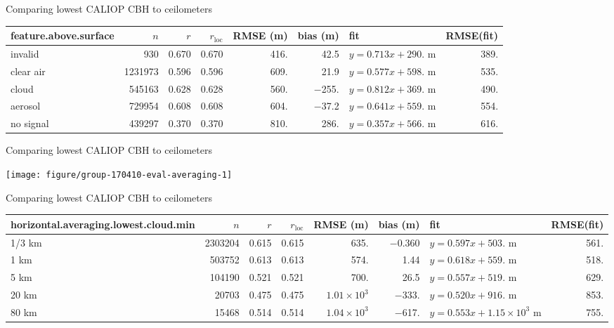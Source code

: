 \documentclass[10pt,notes=all,aspectratio=1610]{beamer}\usepackage[]{graphicx}\usepackage[]{color}
\newenvironment{knitrout}{}{} %
\begin{document}
\begin{frame}[fragile]{Comparing lowest CALIOP CBH to ceilometers}
  \begin{adjustbox}{max width=\textwidth}
\begin{tabular}{lrrrrrlr}
  \hline
\hline
feature.above.surface & $n$ & $r$ & $r_\text{loc}$ & RMSE (m) & bias (m) & fit & RMSE(fit) \\ 
  \hline
invalid &  930 & 0.670 & 0.670 & 416. & 42.5 & $y = 0.713 x + 290.$ m & 389. \\ 
  clear air & 1231973 & 0.596 & 0.596 & 609. & 21.9 & $y = 0.577 x + 598.$ m & 535. \\ 
  cloud & 545163 & 0.628 & 0.628 & 560. & $-$255. & $y = 0.812 x + 369.$ m & 490. \\ 
  aerosol & 729954 & 0.608 & 0.608 & 604. & $-$37.2 & $y = 0.641 x + 559.$ m & 554. \\ 
  no signal & 439297 & 0.370 & 0.370 & 810. & 286. & $y = 0.357 x + 566.$ m & 616. \\ 
   \hline
\hline
\end{tabular}

  \end{adjustbox}
\end{frame}
\begin{frame}[fragile]{Comparing lowest CALIOP CBH to ceilometers}
\begin{knitrout}
\color{fgcolor}

{\centering \texttt{[image: figure/group-170410-eval-averaging-1]} 

}



\end{knitrout}
\end{frame}
\begin{frame}[fragile]{Comparing lowest CALIOP CBH to ceilometers}
  \begin{adjustbox}{max width=\textwidth}
\begin{tabular}{lrrrrrlr}
  \hline
\hline
horizontal.averaging.lowest.cloud.min & $n$ & $r$ & $r_\text{loc}$ & RMSE (m) & bias (m) & fit & RMSE(fit) \\ 
  \hline
1/3 km & 2303204 & 0.615 & 0.615 & 635. & $-$0.360 & $y = 0.597 x + 503.$ m & 561. \\ 
  1 km & 503752 & 0.613 & 0.613 & 574. & 1.44 & $y = 0.618 x + 559.$ m & 518. \\ 
  5 km & 104190 & 0.521 & 0.521 & 700. & 26.5 & $y = 0.557 x + 519.$ m & 629. \\ 
  20 km & 20703 & 0.475 & 0.475 & $1.01 \times 10^{3}$ & $-$333. & $y = 0.520 x + 916.$ m & 853. \\ 
  80 km & 15468 & 0.514 & 0.514 & $1.04 \times 10^{3}$ & $-$617. & $y = 0.553 x + \ensuremath{1.15 \times 10^{3}}$ m & 755. \\ 
   \hline
\hline
\end{tabular}

  \end{adjustbox}
\end{frame}
\end{document}

